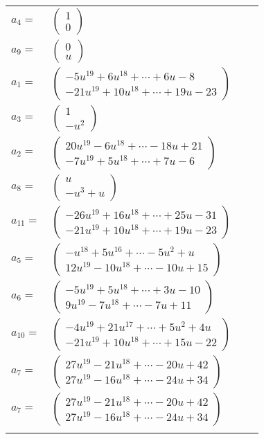 \documentclass[1p]{elsarticle_modified}
\theoremstyle{definition}
\begin{document}
\begin{tabular}{m{7pt} m{180pt} m{7pt} m{180pt} }
\flushright $a_{4}=$&$\begin{pmatrix}1\\0\end{pmatrix}$ \\
\flushright $a_{9}=$&$\begin{pmatrix}0\\u\end{pmatrix}$ \\
\flushright $a_{1}=$&$\begin{pmatrix}-5 u^{19}+6 u^{18}+\cdots+6 u-8\\-21 u^{19}+10 u^{18}+\cdots+19 u-23\end{pmatrix}$ \\
\flushright $a_{3}=$&$\begin{pmatrix}1\\- u^2\end{pmatrix}$ \\
\flushright $a_{2}=$&$\begin{pmatrix}20 u^{19}-6 u^{18}+\cdots-18 u+21\\-7 u^{19}+5 u^{18}+\cdots+7 u-6\end{pmatrix}$ \\
\flushright $a_{8}=$&$\begin{pmatrix}u\\- u^3+u\end{pmatrix}$ \\
\flushright $a_{11}=$&$\begin{pmatrix}-26 u^{19}+16 u^{18}+\cdots+25 u-31\\-21 u^{19}+10 u^{18}+\cdots+19 u-23\end{pmatrix}$ \\
\flushright $a_{5}=$&$\begin{pmatrix}- u^{18}+5 u^{16}+\cdots-5 u^2+u\\12 u^{19}-10 u^{18}+\cdots-10 u+15\end{pmatrix}$ \\
\flushright $a_{6}=$&$\begin{pmatrix}-5 u^{19}+5 u^{18}+\cdots+3 u-10\\9 u^{19}-7 u^{18}+\cdots-7 u+11\end{pmatrix}$ \\
\flushright $a_{10}=$&$\begin{pmatrix}-4 u^{19}+21 u^{17}+\cdots+5 u^2+4 u\\-21 u^{19}+10 u^{18}+\cdots+15 u-22\end{pmatrix}$ \\
\flushright $a_{7}=$&$\begin{pmatrix}27 u^{19}-21 u^{18}+\cdots-20 u+42\\27 u^{19}-16 u^{18}+\cdots-24 u+34\end{pmatrix}$\\ \flushright $a_{7}=$&$\begin{pmatrix}27 u^{19}-21 u^{18}+\cdots-20 u+42\\27 u^{19}-16 u^{18}+\cdots-24 u+34\end{pmatrix}$\\&\end{tabular}
\end{document}
